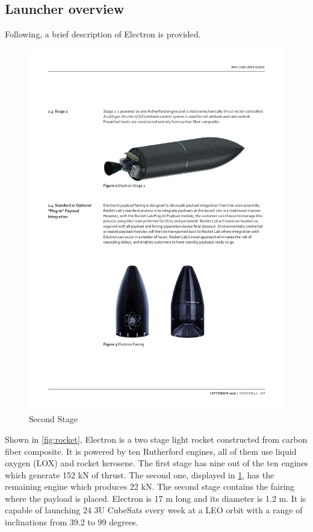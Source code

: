	\subsection{Launcher overview}
Following, a brief description of Electron is provided. 
\newline
\newline
\begin{figure}
\centering 
\includegraphics[scale=0.6]{./Sections_CD/S2-Launcher/Images_S2/Picture_2_S2.pdf} 
\caption{Second Stage}
\label{fig:second}
\end{figure}
Shown in \ref{fig:rocket}, Electron is a two stage light rocket constructed from carbon fiber composite. It is powered by ten Rutherford engines, all of them use liquid oxygen (LOX) and rocket kerosene. The first stage has nine out of the ten engines which generate 152 kN of thrust. The second one, displayed in \ref{fig:second}, has the remaining engine which produces 22 kN. The second stage contains the fairing where the payload is placed. Electron is 17 m long and its diameter is 1.2 m. It is capable of launching 24 3U CubeSats every week at a LEO orbit with a range of inclinations from 39.2 to 99 degrees. 



